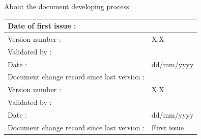 \pagebreak
\begin{center}
  \textsf{\Large About the document developing process}
\end{center}
\begin{tabular}{|p{}|p{}|}
\hline
Date of first issue : &\textsf{}\\
\hline \hline
Version number : &\textsf{X.X}\\ 
Validated by :& \textsf{}\\
Date : & \textsf{dd/mm/yyyy} \\
Document change record since last version : &\textsf{} \\
\hline
Version number : &\textsf{X.X}\\ 
Validated by :& \textsf{}\\
Date : & \textsf{dd/mm/yyyy} \\
Document change record since last version : &\textsf{First issue} \\
\hline
\end{tabular}

%

